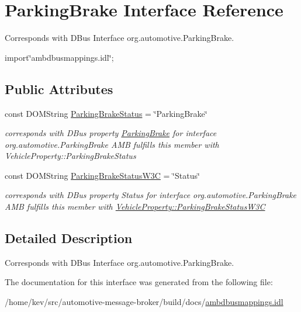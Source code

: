 \hypertarget{interfaceParkingBrake}{\section{Parking\+Brake Interface Reference}
\label{interfaceParkingBrake}
}


Corresponds with D\+Bus Interface org.\+automotive.\+Parking\+Brake.  




{\ttfamily import\char`\"{}ambdbusmappings.\+idl\char`\"{};}

\subsection*{Public Attributes}
\begin{DoxyCompactItemize}
\item 
\hypertarget{interfaceParkingBrake_ad3955889a251a4cf6920501d2cc8adea}{const D\+O\+M\+String \hyperlink{interfaceParkingBrake_ad3955889a251a4cf6920501d2cc8adea}{Parking\+Brake\+Status} = \char`\"{}Parking\+Brake\char`\"{}}\label{interfaceParkingBrake_ad3955889a251a4cf6920501d2cc8adea}

\begin{DoxyCompactList}\small\item\em corresponds with D\+Bus property \hyperlink{interfaceParkingBrake}{Parking\+Brake} for interface org.\+automotive.\+Parking\+Brake A\+M\+B fulfills this member with Vehicle\+Property\+::\+Parking\+Brake\+Status \end{DoxyCompactList}\item 
\hypertarget{interfaceParkingBrake_a549f6509cf0b23bfaae43928fd103da7}{const D\+O\+M\+String \hyperlink{interfaceParkingBrake_a549f6509cf0b23bfaae43928fd103da7}{Parking\+Brake\+Status\+W3\+C} = \char`\"{}Status\char`\"{}}\label{interfaceParkingBrake_a549f6509cf0b23bfaae43928fd103da7}

\begin{DoxyCompactList}\small\item\em corresponds with D\+Bus property Status for interface org.\+automotive.\+Parking\+Brake A\+M\+B fulfills this member with \hyperlink{classVehicleProperty_a7a0b961463207e9cb2f57e7c1061f7ae}{Vehicle\+Property\+::\+Parking\+Brake\+Status\+W3\+C} \end{DoxyCompactList}\end{DoxyCompactItemize}


\subsection{Detailed Description}
Corresponds with D\+Bus Interface org.\+automotive.\+Parking\+Brake. 

The documentation for this interface was generated from the following file\+:\begin{DoxyCompactItemize}
\item 
/home/kev/src/automotive-\/message-\/broker/build/docs/\hyperlink{ambdbusmappings_8idl}{ambdbusmappings.\+idl}\end{DoxyCompactItemize}

